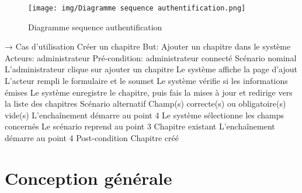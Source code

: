  \begin{figure}[hbtp]
 \centering
 \texttt{[image: img/Diagramme sequence authentification.png]}
 \caption{Diagramme sequence authentification}
 \end{figure}
 

→ Cas d’utilisation Créer un chapitre
But: Ajouter un chapitre dans le système 
Acteurs: administrateur
Pré-condition: administrateur connecté
Scénario nominal 
L’administrateur clique sur ajouter un chapitre
Le système affiche la page d’ajout
L’acteur rempli le formulaire et le soumet
Le système vérifie si les informations émises
Le système enregistre le chapitre, puis fais la mises à jour et redirige vers la liste des chapitres
Scénario alternatif  
Champ(s) correcte(s) ou obligatoire(s) vide(s) 
	           L'enchaînement démarre au point 4
Le système sélectionne les champs concernés
	           Le scénario reprend au point 3
Chapitre existant
           L'enchaînement démarre au point 4
Post-condition 
Chapitre créé


\section{Conception générale}
